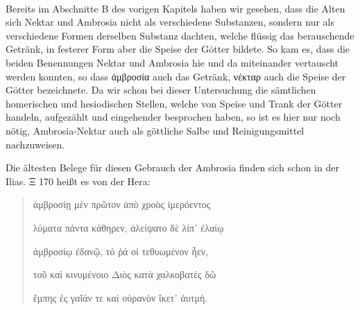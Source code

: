 \documentclass[a4paper, 11pt, oneside]{article}
\begin{document}
\paragraph{}
Bereits im Abschnitte B des vorigen Kapitels haben wir gesehen, dass die Alten sich Nektar und Ambrosia nicht als verschiedene Substanzen, sondern nur als verschiedene Formen derselben Substanz dachten, welche flüssig das berauschende Getränk, in festerer Form aber die Speise der Götter bildete. So kam es, dass die beiden Benennungen Nektar und Ambrosia hie und da miteinander vertauscht werden konnten, so dass ἀμβροσία auch das Getränk, νέκταρ auch die Speise der Götter bezeichnete. Da wir schon bei dieser Untersuchung die sämtlichen homerischen und hesiodischen Stellen, welche von Speise und Trank der Götter handeln, aufgezählt und eingehender besprochen haben, so ist es hier nur noch nötig, Ambrosia-Nektar auch als göttliche Salbe und Reinigungsmittel nachzuweisen.

Die ältesten Belege für diesen Gebrauch der Ambrosia finden sich schon in der Ilias. Ξ 170 heißt es von der Hera:
\begin{quotation}\large
ἀμβροσίῃ μὲν πρῶτον ἀπὸ χροὸς ἱμερόεντος

λύματα πάντα κάθηρεν, ἀλείψατο δὲ λίπ᾽ ἐλαίῳ

ἀμβροσίῳ ἐδανῷ, τό ῥά οἱ τεθυωμένον ἦεν,

τοῦ καὶ κινυμένοιο Διὸς κατὰ χαλκοβατὲς δῶ

ἔμπης ἐς γαῖάν τε καὶ οὐρανὸν ἵκετ᾽ ἀυτμή.
\end{quotation}
\end{document}
